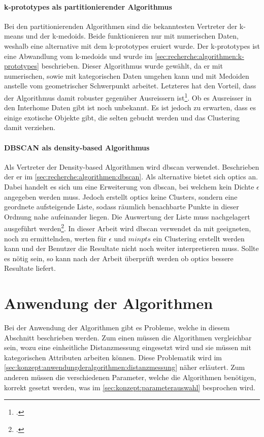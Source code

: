 \paragraph{k-prototypes als partitionierender Algorithmus}
\label{sec:konzept:algorithmenauswahl:clustering:kprototypes}
Bei den partitionierenden Algorithmen sind die bekanntesten Vertreter der k-means und der k-medoids. Beide funktionieren nur mit numerischen Daten, weshalb eine alternative mit dem k-prototypes eruiert wurde. Der k-prototypes ist eine Abwandlung vom k-medoids und wurde im \cref{sec:recherche:algorithmen:k-prototypes} beschrieben. Dieser Algorithmus wurde gewählt, da er mit numerischen, sowie mit kategorischen Daten umgehen kann und mit Medoiden anstelle vom geometrischer Schwerpunkt arbeitet. Letzteres hat den Vorteil, dass der Algorithmus damit robuster gegenüber Ausreissern ist\footcite{data_mining_concepts_and_techniques}. Ob es Ausreisser in den Interhome Daten gibt ist noch unbekannt. Es ist jedoch zu erwarten, dass es einige exotische Objekte gibt, die selten gebucht werden und das Clustering damit verziehen. 

\paragraph{DBSCAN als density-based Algorithmus}
\label{sec:konzept:algorithmenauswahl:clustering:dbscan}
Als Vertreter der Density-based Algorithmen wird \gls{dbscan} verwendet. Beschrieben der er im \cref{sec:recherche:algorithmen:dbscan}. Als alternative bietet sich \gls{optics} an. Dabei handelt es sich um eine Erweiterung von \gls{dbscan}, bei welchem kein Dichte $\epsilon$ angegeben werden muss. Jedoch erstellt \gls{optics} keine Clusters, sondern eine geordnete aufsteigende Liste, sodass räumlich benachbarte Punkte in dieser Ordnung nahe aufeinander liegen. Die Auswertung der Liste muss nachgelagert ausgeführt werden\footcite{data_mining_concepts_and_techniques}. In dieser Arbeit wird \gls{dbscan} verwendet da mit geeigneten, noch zu ermittelnden, werten für $\epsilon$ und $minpts$ ein Clustering erstellt werden kann und der Benutzer die Resultate nicht noch weiter interpretieren muss. Sollte es nötig sein, so kann nach der Arbeit überprüft werden ob \gls{optics} bessere Resultate liefert.

\section{Anwendung der Algorithmen}
\label{sec:konzept:anwendungderalgorithmen}
Bei der Anwendung der Algorithmen gibt es Probleme, welche in diesem Abschnitt beschrieben werden. Zum einen müssen die Algorithmen vergleichbar sein, wozu eine einheitliche Distanzmessung eingesetzt wird und sie müssen mit kategorischen Attributen arbeiten können. Diese Problematik wird im \cref{sec:konzept:anwendungderalgorithmen:distanzmessung} näher erläutert. Zum anderen müssen die verschiedenen Parameter, welche die Algorithmen benötigen, korrekt gesetzt werden, was im \cref{sec:konzept:parameterauswahl} besprochen wird.

